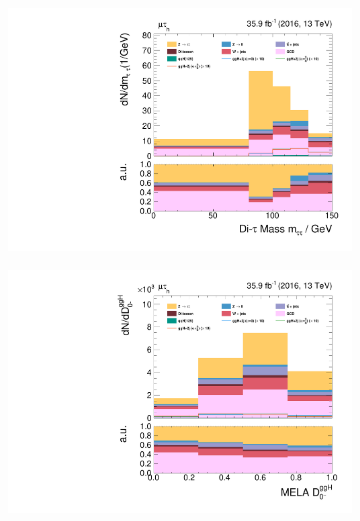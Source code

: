 \clearpage
\begin{figure}[h!]
    \centering
    \begin{subfigure}{.3\textwidth}
        \centering
        \includegraphics[width=\textwidth]{Figures/eventselection/mt/dijet2D_lowboost/m_sv.pdf}
    \end{subfigure}%
    \begin{subfigure}{.3\textwidth}
        \centering
        \includegraphics[width=\textwidth]{Figures/eventselection/mt/dijet2D_lowboost/melaDiscriminatorD0MinusGGH.pdf}
    \end{subfigure}%
    \begin{subfigure}{.3\textwidth}
        \centering

\end{subfigure}
\end{figure}
